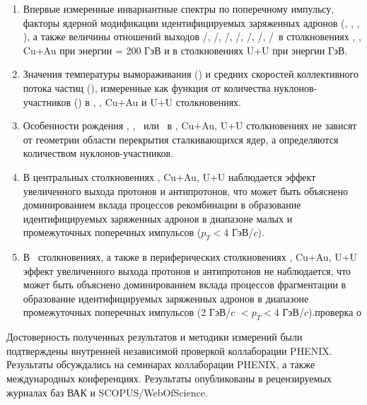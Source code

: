 {}
\begin{enumerate}[beginpenalty=10000] %
	\item Впервые измеренные инвариантные спектры по поперечному импульсу, факторы ядерной модификации идентифицируемых заряженных адронов (\pipm, \Kpm, \prot, \aprot), а также величины отношений выходов \pim/\pip, \Km/\Kp, \prot/\aprot, \prot/\pip, \aprot/\pim, \Kp/\pip, \Km/\pim \ в столкновениях  \pal, \heau, Cu+Au при энергии \sqsn = 200 ГэВ и в столкновениях U+U при энергии  ГэВ. 

	\item Значения температуры вымораживания (\To) и средних скоростей коллективного потока частиц (\ut), измеренные как функция от количества нуклонов-участников (\Npart) в \pal, \heau, Cu+Au и U+U столкновениях.
	
	\item Особенности рождения \pipm, \Kpm, \prot \ или \aprot \ в \heau, Cu+Au, U+U  столкновениях не зависят от геометрии области перекрытия сталкивающихся ядер, а определяются количеством нуклонов-участников.
	
	\item В центральных столкновениях \heau, Cu+Au, U+U наблюдается эффект увеличенного выхода протонов и антипротонов, что может быть объяснено доминированием вклада процессов рекомбинации в образование идентифицируемых заряженных адронов в диапазоне малых и промежуточных поперечных импульсов ($p_{T}<4$ ГэВ/$c$). 
	
	\item В \pal \ столкновениях, а также в периферических столкновениях \heau, Cu+Au, U+U эффект увеличенного выхода протонов и антипротонов не наблюдается, что может быть объяснено доминированием вклада процессов фрагментации в образование идентифицируемых заряженных адронов в диапазоне промежуточных поперечных импульсов (2 ГэВ/$c$ $<p_{T}<4$ ГэВ/$c$).проверка о
	
\end{enumerate}

{\reliability} Достоверность полученных результатов и методики измерений были подтверждены внутренней независимой проверкой коллаборации PHENIX. Результаты обсуждались на семинарах коллаборации PHENIX, а также международных конференциях. Результаты опубликованы в рецензируемых журналах баз ВАК и SCOPUS/WebOfScience.


